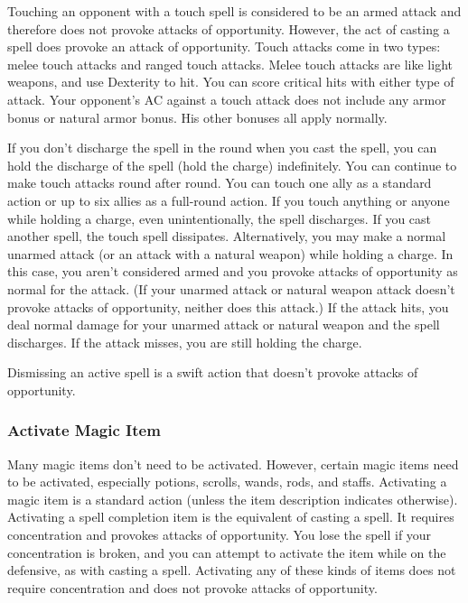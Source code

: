  Touching an opponent with a touch spell is considered to be an armed attack and therefore does not provoke attacks of opportunity. However, the act of casting a spell does provoke an attack of opportunity. Touch attacks come in two types: melee touch attacks and ranged touch attacks. Melee touch attacks are like light weapons, and use Dexterity to hit. You can score critical hits with either type of attack. Your opponent's AC against a touch attack does not include any armor bonus or natural armor bonus. His other bonuses all apply normally.

 If you don't discharge the spell in the round when you cast the spell, you can hold the discharge of the spell (hold the charge) indefinitely. You can continue to make touch attacks round after round. You can touch one ally as a standard action or up to six allies as a full-round action. If you touch anything or anyone while holding a charge, even unintentionally, the spell discharges. If you cast another spell, the touch spell dissipates. Alternatively, you may make a normal unarmed attack (or an attack with a natural weapon) while holding a charge. In this case, you aren't considered armed and you provoke attacks of opportunity as normal for the attack. (If your unarmed attack or natural weapon attack doesn't provoke attacks of opportunity, neither does this attack.) If the attack hits, you deal normal damage for your unarmed attack or natural weapon and the spell discharges. If the attack misses, you are still holding the charge.

 Dismissing an active spell is a swift action that doesn't provoke attacks of opportunity.

\subsubsection{Activate Magic Item}
Many magic items don't need to be activated. However, certain magic items need to be activated, especially potions, scrolls, wands, rods, and staffs. Activating a magic item is a standard action (unless the item description indicates otherwise).
 Activating a spell completion item is the equivalent of casting a spell. It requires concentration and provokes attacks of opportunity. You lose the spell if your concentration is broken, and you can attempt to activate the item while on the defensive, as with casting a spell.
 Activating any of these kinds of items does not require concentration and does not provoke attacks of opportunity.

